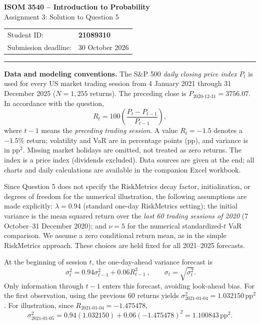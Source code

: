 \documentclass[10pt,a4paper]{article}
\newcommand{\pp}{\,\text{pp}}
\newcommand{\parthead}[1]{\vspace{7pt}\noindent{\large\bfseries\color{heading}#1}\par\vspace{2pt}}
\begin{document}
\begin{center}
{\Large\bfseries ISOM 3540 -- Introduction to Probability}\\[3pt]
{\large Assignment 3: Solution to Question 5}\\[4pt]
\begin{tabular}{@{}ll@{}}
Student ID: & \textbf{21089310}\\
Submission deadline: & 30 October 2026
\end{tabular}
\end{center}
\vspace{4pt}\hrule\vspace{8pt}

\textbf{Data and modeling conventions.}
The S\&P 500 \emph{daily closing price index} $P_t$ is used for every US market trading session from 4 January 2021 through 31 December 2025 ($N=1{,}255$ returns). The preceding close is $P_{\mathrm{2020\mbox{-}12\mbox{-}31}}=3756.07$. In accordance with the question,
\begin{equation}
R_t=100\left(\frac{P_t-P_{t-1}}{P_{t-1}}\right),
\label{eq:return}
\end{equation}
where $t-1$ means the \emph{preceding trading session}. A value $R_t=-1.5$ denotes a $-1.5\%$ return; volatility and VaR are in percentage points (pp), and variance is in pp$^2$. Missing market holidays are omitted, not treated as zero returns. The index is a price index (dividends excluded). Data sources are given at the end; all charts and daily calculations are available in the companion Excel workbook.

Since Question 5 does not specify the RiskMetrics decay factor, initialization, or degrees of freedom for the numerical illustration, the following assumptions are made explicitly: $\lambda=0.94$ (standard one-day RiskMetrics setting); the initial variance is the mean squared return over the \emph{last 60 trading sessions of 2020} (7 October--31 December 2020); and $\nu=5$ for the numerical standardized-$t$ VaR comparison. We assume a zero conditional return mean, as in the simple RiskMetrics approach. These choices are held fixed for all 2021--2025 forecasts.

\parthead{(a) RiskMetrics variance in 2021--2025}
At the beginning of session $t$, the one-day-ahead variance forecast is
\begin{equation}
\boxed{\ \sigma_t^2=0.94\sigma_{t-1}^2+0.06R_{t-1}^2\ },\qquad \sigma_t=\sqrt{\sigma_t^2}.\label{eq:ewma}
\end{equation}
Only information through $t-1$ enters this forecast, avoiding look-ahead bias. For the first observation, using the previous 60 returns yields $\sigma_{\mathrm{2021\mbox{-}01\mbox{-}04}}^2=1.032150\pp^2$. For illustration, since $R_{\mathrm{2021\mbox{-}01\mbox{-}04}}=-1.475478$,
\[
\sigma_{\mathrm{2021\mbox{-}01\mbox{-}05}}^2
=0.94(1.032150)+0.06(-1.475478)^2
=\boxed{1.100843\pp^2}.
\]
\end{document}
